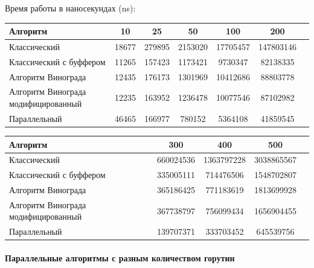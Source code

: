 \documentclass[utf8x, 12pt]{G7-32} %
\begin{document}
Время работы в наносекундах (ns):\\
\begin{tabular}{l*{5}{c}r}
	Алгоритм & 10 & 25 & 50 & 100 & 200 \\
	\hline
	Классический & 18677 & 279895 & 2153020 & 17705457 & 147803146 \\
	Классический с буффером & 11265 & 157423 & 1173421 & 9730347 & 82138335 \\
	Алгоритм Винограда & 12435 & 176173 & 1301969 & 10412686 & 88803778 \\
	Алгоритм Винограда модифицированный & 12235 & 163952 & 1236478 & 10077546 & 87102982 \\
	Параллельный & 46465 & 166977 & 780152 & 5364108 & 41859545 \\
\end{tabular}
\begin{tabular}{l*{3}{c}r}
	Алгоритм & 300 & 400 & 500 \\
	\hline
	Классический & 660024536 & 1363797228 & 3038865567 \\
	Классический с буффером & 335005111 & 714476506 & 1548702807 \\
	Алгоритм Винограда & 365186425 & 771183619 & 1813699928 \\
	Алгоритм Винограда модифицированный & 367738797 & 756099434 & 1656904455 \\
	Параллельный & 139707371 & 333703452 & 645539756 \\
\end{tabular}

\begin{flushleft}
	\paragraph{Параллельные алгоритмы с разным количеством горутин}
\end{flushleft}
\end{document}

